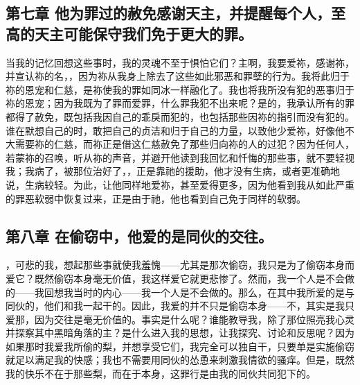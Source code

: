 
\subsection{第七章 他为罪过的赦免感谢天主，并提醒每个人，至高的天主可能保守我们免于更大的罪。}

当我的记忆回想这些事时，我的灵魂不至于惧怕它们？主啊，我要爱祢，感谢祢，并宣认祢的名，，因为祢从我身上除去了这些如此邪恶和罪孽的行为。我将此归于祢的恩宠和仁慈，是祢使我的罪如同冰一样融化了。我也将我所没有犯的恶事归于祢的恩宠；因为我既为了罪而爱罪，什么罪我犯不出来呢？是的，我承认所有的罪都得了赦免，既包括我因自己的乖戾而犯的，也包括那些因祢的指引而没有犯的。谁在默想自己的时，敢把自己的贞洁和归于自己的力量，以致他少爱祢，好像他不大需要祢的仁慈，而祢正是借这仁慈赦免了那些归向祢的人的过犯？因为任何人，若蒙祢的召唤，听从祢的声音，并避开他读到我回忆和忏悔的那些事，就不要轻视我；我病了，被那位治好了，，正是靠祂的援助，他才没有生病，或者更准确地说，生病较轻。为此，让他同样地爱祢，甚至爱得更多，因为他看到我从如此严重的罪恶软弱中恢复过来，正是由于祂，他也看到自己免于同样的软弱。\par


\subsection{第八章 在偷窃中，他爱的是同伙的交往。}

，可悲的我，想起那些事就使我羞愧——尤其是那次偷窃，我只是为了偷窃本身而爱它？既然偷窃本身毫无价值，我这样爱它就更悲惨了。然而，我一个人是不会做的——我回想我当时的内心——我一个人是不会做的。那么，在其中我所爱的是与同伙的，他们和我一起干的。因此，我爱的并不只是偷窃本身——不，其实是我只爱那，因为交往是毫无价值的。事实是什么呢？谁能教导我，除了那位照亮我心灵并探察其中黑暗角落的主？是什么进入我的思想，让我探究、讨论和反思呢？因为如果那时我爱我所偷的梨，并想享受它们，我完全可以独自干，只要单是实施偷窃就足以满足我的快感；我也不需要用同伙的怂恿来刺激我情欲的骚痒。但是，既然我的快乐不在于那些梨，而在于本身，这罪行是由我的同伙共同犯下的。\par

